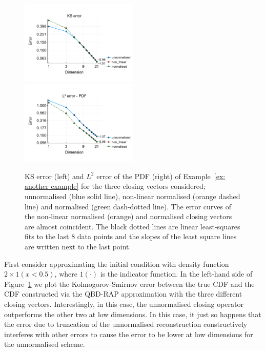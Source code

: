 \begin{example}\label{ex: another example}
	\begin{figure}[h]
		\centering
		\includegraphics[width=0.5\textwidth,trim={0.5cm 0.8cm 0.2cm 1.25cm},clip]{chapter6/figs/qbdrap_closing_vec/fun2/ks_error_formatted.pdf}%
		\includegraphics[width=0.5\textwidth,trim={0.5cm 0.8cm 0.2cm 1.25cm},clip]{chapter6/figs/qbdrap_closing_vec/fun2/l2_pdf_error_formatted.pdf}
		\caption{KS error (left) and \(L^2\) error of the PDF (right) of Example~\ref{ex: another example} for the three closing vectors considered; unnormalised (blue solid line), non-linear normalised (orange dashed line) and normalised (green dash-dotted line). The error curves of the non-linear normalised (orange) and normalised closing vectors are almost coincident. The black dotted lines are linear least-squares fits to the last 8 data points and the slopes of the least square lines are written next to the last point.}%
		\label{fig: fun 2 ks error qbdrap closing vecs}
	\end{figure} 
	First consider approximating the initial condition with density function \(2\times 1(x<0.5)\), where \(1(\cdot)\) is the indicator function. In the left-hand side of Figure~\ref{fig: fun 2 ks error qbdrap closing vecs} we plot the Kolmogorov-Smirnov error between the true CDF and the CDF constructed via the QBD-RAP approximation with the three different closing vectors. Interestingly, in this case, the unnormalised closing operator outperforms the other two at low dimensions. In this case, it just so happens that the error due to truncation of the unnormalised reconstruction constructively interferes with other errors to cause the error to be lower at low dimensions for the unnormalised scheme. 
	

\end{example}

